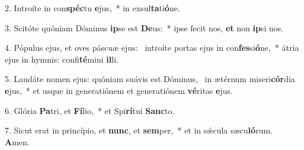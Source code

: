 2. Introíte in con\textbf{spéc}tu \textbf{e}jus,~*  in exsul\textbf{ta}ti\textbf{ó}ne.\

3. Scitóte quóniam Dóminus \textbf{ip}se est \textbf{De}us:~*  ipse fecit nos, \textbf{et} non \textbf{ip}si nos.\

4. Pópulus ejus, et oves páscuæ ejus: \dag\  introíte portas ejus in con\textbf{fes}si\textbf{ó}ne,~*  átria ejus in hymnis: confi\textbf{té}mini \textbf{il}li.\

5. Laudáte nomen ejus: quóniam suávis est Dóminus, \dag\  in ætérnum miseri\textbf{cór}dia \textbf{e}jus,~*  et usque in generatiónem et generatiónem \textbf{vé}ritas \textbf{e}jus.\

6. Glória \textbf{Pa}tri, et \textbf{Fí}lio,~*  et Spi\textbf{rí}tui \textbf{Sanc}to.\

7. Sicut erat in princípio, et \textbf{nunc}, et \textbf{sem}per,~*  et in sǽcula sæcu\textbf{ló}rum. \textbf{A}men.\

